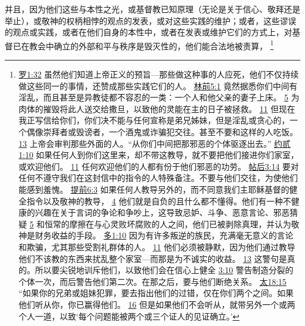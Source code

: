 \documentclass[12pt, a4paper, oneside]{ctexart}
\begin{document}
	并且，因为他们这些与本性之光，或基督教已知原理（无论是关于信心、敬拜还是举止），或敬神的权柄相悖的观点的发表，或对这些实践的维护；或者，这些谬误的观点或实践，或者在他们自身的本性中，或者在发表或维护它们的方式上，对基督已在教会中确立的外部和平与秩序是毁灭性的，他们能合法地被责算，
	\footnote {
		\href{https://biblehub.com/romans/1-32.htm}{罗1:32} 虽然他们知道上帝正义的预旨---那些做这种事的人应死，他们不仅持续做这些同一的事情，还赞成那些实践它们的人。
		\href{https://biblehub.com/1_corinthians/5-1.htm}{林前5:1} 竟然据悉你们中间有淫乱，而且甚至是异教徒都不容忍的一类：一个人和他父亲的妻子上床。
		\href{https://biblehub.com/1_corinthians/5-5.htm}{5} 为肉体的摧毁将此人送交给撒旦，以致他的灵能在主的日子被拯救。
		\href{https://biblehub.com/1_corinthians/5-11.htm}{11} 但现在我正写信给你们，你们决不能与任何宣称是弟兄姊妹，但是淫乱或贪心的，一个偶像崇拜者或毁谤者，一个酒鬼或诈骗犯交往。甚至不要和这样的人吃饭。
		\href{https://biblehub.com/1_corinthians/5-13.htm}{13} 上帝会审判那些外面的人。“从你们中间把那邪恶的个体驱逐出去。”
		\href{https://biblehub.com/2_john/1-10.htm}{约贰1:10} 如果任何人到你们这里来，却不带这教导，就不要把他们接进你们家室，或欢迎他们。
		\href{https://biblehub.com/2_john/1-11.htm}{11} 任何欢迎他们的人都有份于他们邪恶的功劳。
		\href{https://biblehub.com/2_thessalonians/3-14.htm}{帖后3:14} 要对任何不遵守我们在这封信中的指令的人特殊备注。不要与他们交往，为使他们能感到羞愧。
		\href{https://biblehub.com/1_timothy/6-3.htm}{提前6:3} 如果任何人教导另外的，而不同意我们主耶稣基督的健全指令以及敬神的教导，
		\href{https://biblehub.com/1_timothy/6-4.htm}{4} 他们就是自负的且什么都不懂得。他们有一种不健康的兴趣在关于言词的争论和争吵上，这导致忌妒、斗争、恶意言论、邪恶猜疑
		\href{https://biblehub.com/1_timothy/6-5.htm}{5} 和恒常的摩擦在与心灵败坏腐败的人之间，他们已被剥除真理，并认为敬神是财务收益的手段。
		\href{https://biblehub.com/titus/1-10.htm}{多1:10} 因为有许多叛逆的族民，充满毫无意义的言论和欺骗，尤其那些受割礼群体的人。
		\href{https://biblehub.com/titus/1-11.htm}{11} 他们必须被静默，因为他们通过教导他们不该教的东西来扰乱整个家室---而那是为不诚实的收益。
		\href{https://biblehub.com/titus/1-13.htm}{13} 这警句是真的。所以要尖锐地训斥他们，以致他们会在信心上健全
		\href{https://biblehub.com/titus/3-10.htm}{3:10} 警告制造分裂的个体一次，而后警告他们第二次。在那之后，要与他们断绝关系。
		\href{https://biblehub.com/matthew/18-15.htm}{太18:15} “如果你的兄弟或姐妹犯罪，要去指出他们的过错，仅在你们两个之间。如果他们听从你，你已赢得他们。
		\href{https://biblehub.com/matthew/18-16.htm}{16} 但是如果他们不会听从，就带另外一个或两个人一道，以致‘每个问题能被两个或三个证人的见证确立。’
}
\end{document}
